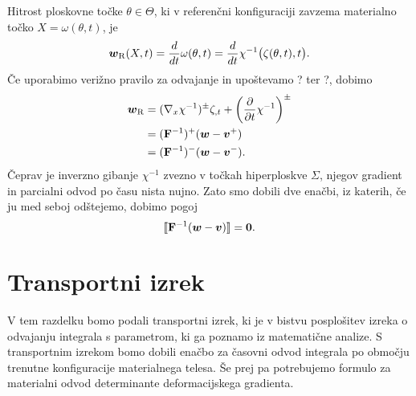 Hitrost ploskovne točke $\theta\in\Theta$, ki v referenčni konfiguraciji zavzema materialno točko
$X=\omega(\theta,t)$, je
\[
	\boldsymbol w_{\mathrm R}(X,t)=\frac{d}{dt}\omega(\theta, t)=\frac{d}{dt}\chi^{-1}\big(\zeta(\theta,t),t\big).
\]
Če uporabimo verižno pravilo za odvajanje in upoštevamo ? ter ?, dobimo
\begin{align}
	\boldsymbol w_{\mathrm R}&=(\nabla_{x}\chi^{-1})^{\pm}\zeta_{,t}+\left(\frac{\partial}{\partial t}\chi^{-1}\right)^{\pm} \nonumber \\
	&=(\mathbf F^{-1})^+(\boldsymbol w-\boldsymbol v^+) \label{e:w} \\
	&=(\mathbf F^{-1})^-(\boldsymbol w-\boldsymbol v^-). \nonumber
\end{align}
Čeprav je inverzno gibanje $\chi^{-1}$ zvezno v točkah hiperploskve $\Sigma$, njegov gradient in
parcialni odvod po času nista nujno. Zato smo dobili dve enačbi, iz katerih, če ju med seboj odštejemo, dobimo pogoj
\[ \llbracket \mathbf F^{-1}(\boldsymbol w-\boldsymbol v) \rrbracket = \boldsymbol 0. \]


\section{Transportni izrek}


V tem razdelku bomo podali transportni izrek, ki je v bistvu posplošitev izreka o odvajanju
integrala s parametrom, ki ga poznamo iz matematične analize. S transportnim izrekom
bomo dobili enačbo za časovni odvod integrala po območju trenutne konfiguracije materialnega telesa.
Še prej pa potrebujemo formulo za materialni odvod determinante deformacijskega gradienta.

